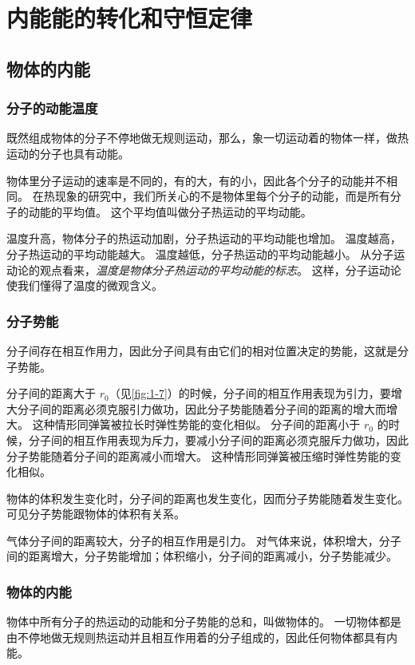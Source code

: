 
\chapter{内能\texorpdfstring{\quad}{ }能的转化和守恒定律}
\section{物体的内能}
\subsection{分子的动能\texorpdfstring{\quad}{ }温度} 
既然组成物体的分子不停地做无规则运动，那么，象一切运动着的物体一样，做热运动的分子也具有动能。

物体里分子运动的速率是不同的，有的大，有的小，因此各个分子的动能并不相同。
在热现象的研究中，我们所关心的不是物体里每个分子的动能，而是所有分子的动能的平均值。
这个平均值叫做分子热运动的平均动能。

温度升高，物体分子的热运动加剧，分子热运动的平均动能也增加。
温度越高，分子热运动的平均动能越大。
温度越低，分子热运动的平均动能越小。
从分子运动论的观点看来，\emph{温度是物体分子热运动的平均动能的标志}。
这样，分子运动论使我们懂得了温度的微观含义。

\subsection{分子势能} 
分子间存在相互作用力，因此分子间具有由它们的相对位置决定的势能，这就是分子势能。

分子间的距离大于 $r_0$（见\cref{fig:1-7}）的时候，分子间的相互作用表现为引力，要增大分子间的距离必须克服引力做功，因此分子势能随着分子间的距离的增大而增大。
这种情形同弹簧被拉长时弹性势能的变化相似。
分子间的距离小于 $r_0$ 的时候，分子间的相互作用表现为斥力，要减小分子间的距离必须克服斥力做功，因此分子势能随着分子间的距离减小而增大。
这种情形同弹簧被压缩时弹性势能的变化相似。

物体的体积发生变化时，分子间的距离也发生变化，因而分子势能随着发生变化。
可见分子势能跟物体的体积有关系。

气体分子间的距离较大，分子的相互作用是引力。
对气体来说，体积增大，分子间的距离增大，分子势能增加；体积缩小，分子间的距离减小，分子势能减少。

\subsection{物体的内能} 
物体中所有分子的热运动的动能和分子势能的总和，叫做物体的。
一切物体都是由不停地做无规则热运动并且相互作用着的分子组成的，因此任何物体都具有内能。

